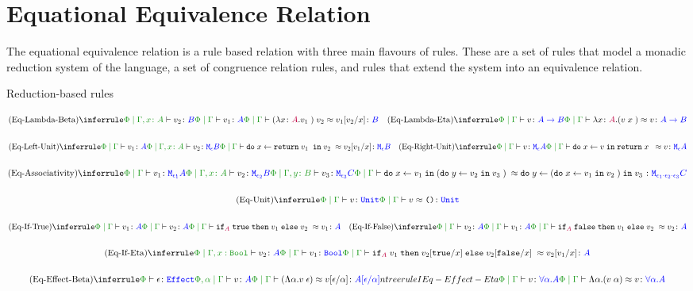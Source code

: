 \documentclass{report}
\begin{document}
\section{Equational Equivalence Relation}

The equational equivalence relation is a rule based relation with three main flavours of rules. These are a set of rules that model a monadic reduction system of the language, a set of congruence relation rules, and rules that extend the system into an equivalence relation.


Reduction-based rules
    \begin{framed}
        \[
            \scalebox{0.8}{$
            \ntreeruleII{\eqbeta}{\etyperelation{\P}{\gax}{v_2}{B}}{\gpetyperelation{v_1}{A}}{\gpeberelation{\apply{(\lam{x}{A}{v_1})}{v_2} }{ v_1\ssub{x}{v_2}}{B}}
            \quad
            \ntreeruleI{\eqeta}{\gpetyperelation{v}{\ab}}{\gpeberelation{\lam{x}{A}{(\apply{v}{x}})}{v}{\ab}}
            $}
        \]
    
        \[\scalebox{0.8}{$
            \ntreeruleII{\eqleftunit}{\gpetyperelation{v_1}{A} }{ \etyperelation{\P}{\gax}{v_2}{\meb}}{\gpeberelation{\doin{x}{\return{v_1}}{v_2}}{v_2\ssub{x}{v_1}}{\meb}}
            \quad
            \ntreeruleI{\eqrightunit}{\gpetyperelation{v}{\mea}}{\gpeberelation{\doin{x}{v}{\return{x}} }{v}{\mea}}
        $}\]
    
        \[\scalebox{0.8}{$
            \ntreeruleIII{\eqassociativity}{\gpetyperelation{v_1}{\M{\e_1}{A}} }{\etyperelation{\P}{\gax}{v_2}{\M{\e_2}{B}}}{ \etyperelation{\P}{\gby}{v_3}{\M{\e_3}{C}}}{
                \gpeberelation{\doin{x}{v_1}{(\doin{y}{v_2}{v_3})}}{\doin{y}{(\doin{x}{v_1}{v_2})}{v_3}}{\M{\e_1 \dot \e_2 \dot \e_3}{C}}
            }
        $}\]
    
        \[\scalebox{0.8}{$
            \ntreeruleI{\equnitequiv}{\gpetyperelation{v}{\U}}{\gpeberelation{v}{\u}{\U}}
        $}\]
    
        \[\scalebox{0.8}{$
            \ntreeruleII{\eqiftrue}{\gpetyperelation{v_1}{A}}{\gpetyperelation{v_2}{A}}{\gpeberelation{\pifthenelse{A}{\t}{v_1}{v_2}}{v_1}{A}}
            \quad
            \ntreeruleII{\eqiffalse}{\gpetyperelation{v_2}{A}}{\gpetyperelation{v_1}{A}}{\gpeberelation{\pifthenelse{A}{\f}{v_1}{v_2}}{v_2}{A}}    
        $}\]
    
        \[\scalebox{0.8}{$
            \ntreeruleII{\eqifeta}{\etyperelation{\P}{\G, x: \B}{v_2}{A}}{\gpetyperelation{v_1}{\B}}{\gpeberelation{\pifthenelse{A}{v_1}{v_2\ssub{x}{\t}}{v_2\ssub{x}{\f}}}{v_2\ssub{x}{v_1}}{A}}
        $}\]
    
        \[\scalebox{0.8}{$
            \ntreeruleII{\eqeffbeta}{\wellformede{\P}{\e}}{\etyperelation{\P, \a}{\G}{v}{A}}{\gpeberelation{\eapp{(\elam{\a}{v}}{\e})}{v\ssub{\a}{\e}}{A\ssub{\a}{\e}}}
            \quad 
            \\ntreeruleI{\eqeffeta}{\etyperelation{\P}{\G}{v}{\all{\a}{A}}}{\gpeberelation{\elam{\a}{(\eapp{v}{\a})}}{v}{\all{\a}{A}}}
        $}\]
    \end{framed}
\end{document}
